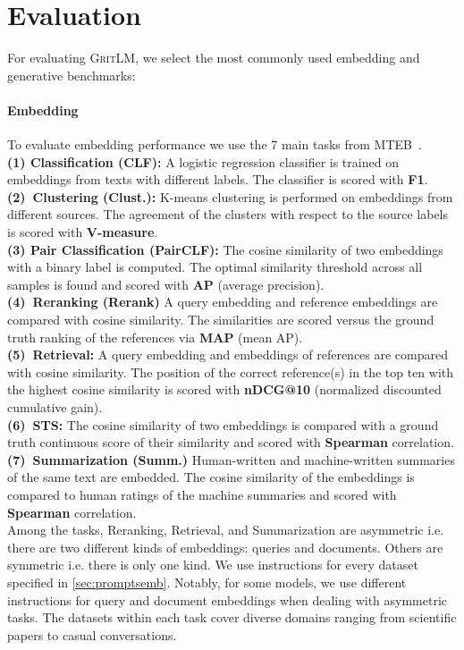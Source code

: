 \documentclass{article}
\newcommand{\model}{\textsc{GritLM}}
\begin{document}
\FloatBarrier

\section{Evaluation}
\label{sec:eval}

For evaluating \model{}, we select the most commonly used embedding and generative benchmarks:

\paragraph{Embedding} To evaluate embedding performance we use the 7 main tasks from MTEB~\cite{muennighoff2023mteb}. \\
\textbf{(1) Classification (CLF):} A logistic regression classifier is trained on embeddings from texts with different labels. The classifier is scored with \textbf{F1}.\\
\textbf{(2)~Clustering (Clust.):} K-means clustering is performed on embeddings from different sources. The agreement of the clusters with respect to the source labels is scored with \textbf{V-measure}.\\
\textbf{(3) Pair Classification (PairCLF):} The cosine similarity of two embeddings with a binary label is computed. The optimal similarity threshold across all samples is found and scored with \textbf{AP} (average precision).\\
\textbf{(4)~Reranking (Rerank)} A query embedding and reference embeddings are compared with cosine similarity. The similarities are scored versus the ground truth ranking of the references via \textbf{MAP} (mean AP).\\
\textbf{(5)~Retrieval:} A query embedding and embeddings of references are compared with cosine similarity. The position of the correct reference(s) in the top ten with the highest cosine similarity is scored with \textbf{nDCG@10} (normalized discounted cumulative gain).\\
\textbf{(6)~STS:} The cosine similarity of two embeddings is compared with a ground truth continuous score of their similarity and scored with \textbf{Spearman} correlation.\\
\textbf{(7)~Summarization (Summ.)} Human-written and machine-written summaries of the same text are embedded. The cosine similarity of the embeddings is compared to human ratings of the machine summaries and scored with \textbf{Spearman} correlation.\\
Among the tasks, Reranking, Retrieval, and Summarization are asymmetric i.e. there are two different kinds of embeddings: queries and documents. Others are symmetric i.e. there is only one kind. We use instructions for every dataset specified in \autoref{sec:promptsemb}. Notably, for some models, we use different instructions for query and document embeddings when dealing with asymmetric tasks. The datasets within each task cover diverse domains ranging from scientific papers to casual conversations.
\end{document}
